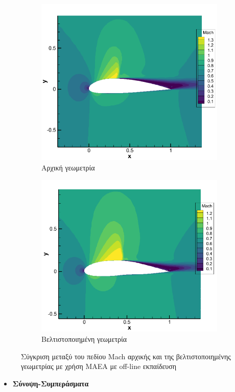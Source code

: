 \documentclass[twoside, 12pt,notitlepage]{report}
\begin{document}
\begin{figure}[h!]
\centering
	\begin{subfigure}[b]{0.49\textwidth}
	\centering
	\caption{Αρχική γεωμετρία}
	\includegraphics[width=\textwidth, height=0.64\textwidth, 
	scale=1]{cruise_baseline_Mach} 
	\end{subfigure}
	\hfill
	\begin{subfigure}[b]{0.49\textwidth}
	\centering
	\caption{Βελτιστοποιημένη γεωμετρία}
	\includegraphics[width=\textwidth, height=0.64\textwidth, 
	scale=1]{cruise_offline_Mach}   
	\end{subfigure}
\caption{Σύγκριση μεταξύ του πεδίου Mach αρχικής και της 
βελτιστοποιημένης γεωμετρίας με χρήση MAEA με off-line εκπαίδευση} 
\end{figure}


\newpage


\begin{itemize}
\item \textbf{Σύνοψη-Συμπεράσματα}
\end{itemize}
\end{document}
